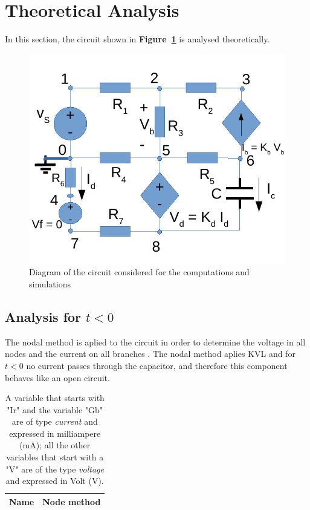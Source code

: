 \section{Theoretical Analysis}
\label{sec:analysis}

In this section, the circuit shown in \textbf{Figure~\ref{fig:diagram_t2}} is analysed
theoretically.\par

\begin{figure}[h] \centering
\includegraphics[width=0.6\linewidth]{diagram_t2.pdf}
\caption{Diagram of the circuit considered for the computations and simulations}
\label{fig:diagram_t2}
\end{figure}


\subsection{Analysis for $t<0$} 
The nodal method is aplied to the circuit in order to determine the voltage in all nodes and the current on all branches . The nodal method aplies KVL and for $t<0$ no current passes through the capacitor, and therefore this component behaves like an open circuit.
 \pagebreak 
\begin{table}[h]
  \centering
  \begin{tabular}{|l|r|}
    \hline    
    {\bf Name} & {\bf Node method}\\ \hline
    
  \end{tabular}
  \caption{A variable that starts with "Ir" and the variable "Gb" are of type {\em current}
    and expressed in milliampere (mA); all the other variables that start with a "V" are of the type {\it voltage} and expressed in
    Volt (V).}
  \label{tab:theoretical}
\end{table}



